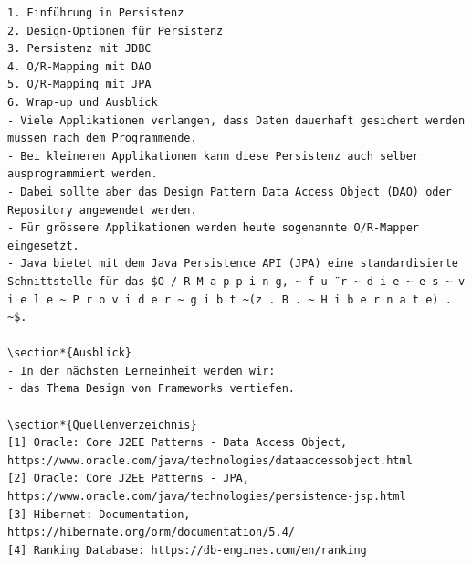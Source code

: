 \documentclass[10pt]{article}
\begin{document}
\begin{verbatim}
1. Einführung in Persistenz
2. Design-Optionen für Persistenz
3. Persistenz mit JDBC
4. O/R-Mapping mit DAO
5. O/R-Mapping mit JPA
6. Wrap-up und Ausblick
- Viele Applikationen verlangen, dass Daten dauerhaft gesichert werden müssen nach dem Programmende.
- Bei kleineren Applikationen kann diese Persistenz auch selber ausprogrammiert werden.
- Dabei sollte aber das Design Pattern Data Access Object (DAO) oder Repository angewendet werden.
- Für grössere Applikationen werden heute sogenannte O/R-Mapper eingesetzt.
- Java bietet mit dem Java Persistence API (JPA) eine standardisierte Schnittstelle für das $O / R-M a p p i n g, ~ f u ̈ r ~ d i e ~ e s ~ v i e l e ~ P r o v i d e r ~ g i b t ~(z . B . ~ H i b e r n a t e) . ~$.

\section*{Ausblick}
- In der nächsten Lerneinheit werden wir:
- das Thema Design von Frameworks vertiefen.

\section*{Quellenverzeichnis}
[1] Oracle: Core J2EE Patterns - Data Access Object, https://www.oracle.com/java/technologies/dataaccessobject.html
[2] Oracle: Core J2EE Patterns - JPA,
https://www.oracle.com/java/technologies/persistence-jsp.html
[3] Hibernet: Documentation, https://hibernate.org/orm/documentation/5.4/
[4] Ranking Database: https://db-engines.com/en/ranking
\end{verbatim}
\end{document}
